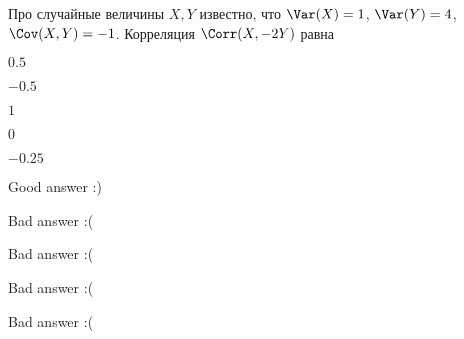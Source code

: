 
\begin{question}
Про случайные величины \(X, Y\) известно, что \(\Var(X)=1\),
\(\Var(Y)=4\), \(\Cov(X,Y)=-1\). Корреляция \(\Corr(X,-2Y)\) равна
\begin{answerlist}
  \item \(0.5\)
  \item \(-0.5\)
  \item \(1\)
  \item \(0\)
  \item \(-0.25\)
\end{answerlist}
\end{question}

\begin{solution}
\begin{answerlist}
  \item Good answer :)
  \item Bad answer :(
  \item Bad answer :(
  \item Bad answer :(
  \item Bad answer :(
\end{answerlist}
\end{solution}

